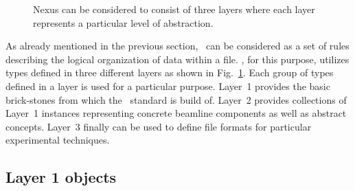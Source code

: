 \begin{figure}[tb]
    \centering
    \begin{minipage}[c]{0.5\linewidth}
    \centering
    \end{minipage}
    \hfill
    \begin{minipage}[c]{0.45\linewidth}
    \caption{{\small Nexus can be considered to consist of three layers where
    each layer represents a particular level of abstraction.}}
    \label{fig:nxintro:layers}
    \end{minipage}
\end{figure}
As already mentioned in the previous section, \nexus\ can be considered as a set
of rules describing the logical organization of data within a file. 
\nexus, for this purpose, utilizes types defined in three different layers as 
shown in Fig.~\ref{fig:nxintro:layers}.
Each group of types defined in a layer is used for a particular purpose. Layer~1
provides the basic brick-stones from which the \nexus\ standard is build of. 
Layer~2 provides collections of Layer~1 instances representing concrete beamline
components as well as abstract concepts. Layer~3 finally can be used to define 
file formats for particular experimental techniques. 

\subsection{Layer 1 objects}

